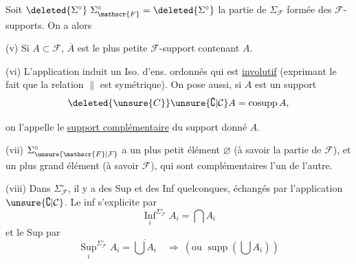 
Soit $\deleted{\Sigma^\circ}\ \Sigma_{\mathscr{F}}^\circ=\deleted{\Sigma^\circ}$ la partie de $\Sigma_{\mathscr{F}}$ formée des  $\mathscr{F}$-supports. On a alors

(v) Si $A\subset\mathscr{F}$, $\overline A$ est le plus petite   $\mathscr{F}$-support contenant $A$.

(vi) L'application
induit un  Iso. d'ens. ordonnés
qui est \uline{involutif} (exprimant le fait que la relation $\parallel$ est symétrique). On pose aussi, si $A$ est un support
\[
\deleted{\unsure{C}}\unsure{\complement|\mathcal{C}}A=\operatorname{cosupp}A,
\]


on l'appelle le \uline{support complémentaire} du support donné $A$.

(vii) $\Sigma_{\unsure{\mathscr{F}|\mathcal{F}}}^\circ$ a un plus petit élément $\varnothing$ (à savoir la partie  de $\mathscr{F}$), et un plus grand élément (à savoir $\mathscr{F}$), qui sont complémentaires l'un de l'autre.


(viii)  Dans $\Sigma_{\mathscr{F}}^\circ$, il y a des Sup et des Inf quelconques, échangés par l'application $\unsure{\complement|\mathcal{C}}$. Le  inf s'explicite par
\[
\underset{i}{\operatorname{Inf}}^{\Sigma_{\mathscr{F}}^\circ}A_i=\bigcap A_i
\]
et le Sup par
\[
\underset{i}{\operatorname{Sup}}^{\Sigma_{\mathscr{F}}^\circ}A_i=\overline{\bigcup A_i}\quad\Rightarrow\ (\text{ou }\operatorname{supp}(\bigcup A_i))
\]

